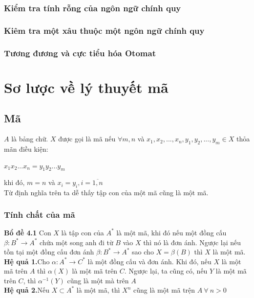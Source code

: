 \documentclass[14pt]{extreport}
\begin{document}
\subsection{Kiểm tra tính rỗng của ngôn ngữ chính quy}
\subsection{Kiêm tra một xâu thuộc một ngôn ngữ chính quy}
\subsection{Tương đương và cực tiểu hóa Otomat}
\chapter{Sơ lược về lý thuyết mã}
\section{Mã}
$A$ là bảng chữ. $X$ được gọi là mã nếu $\forall m,n$ và $x_1,x_2,...,x_n,y_1,y_2,...,y_m \in X$ thỏa mãn điều kiện:
\begin{center}
$x_1x_2...x_n=y_1y_2...y_m$
\end{center}
khi đó, $m=n$ và $x_i=y_i,i=\overline{1,n}$ \\
Từ định nghĩa trên ta dễ thấy tập con của một mã cũng là một mã.
\subsection{Tính chất của mã}
\textbf{Bổ đề 4.1} Con $X$ là tập con của $A^*$ là một mã, khi đó nếu một đồng cấu $\beta : B^* \rightarrow A^*$ chứa một song anh đi từ $B$ vào $X$ thì nó là đơn ánh. Ngược lại nếu tồn tại một đồng cấu đơn ánh $\beta : B^* \rightarrow A^*$ sao cho $X = \beta(B)$ thì $X$ là một mã. \\
\textbf{Hệ quả 1.}Cho $\alpha : A^* \rightarrow C^*$ là một đồng cấu và đơn ánh. Khi đó, nếu $X$ là một mã trên $A$ thì $\alpha (X)$ là một mã trên $C$. Ngược lại, ta cũng có, nếu $Y$ là một mã trên $C$, thì $\alpha^{-1}(Y)$ cũng là một mà trên $A$ \\
\textbf{Hệ quả 2.}Nếu $X \subset A^*$ là một mã, thì $X^n$ cũng là một mã trện $A \ \forall \ n > 0$
\end{document}
